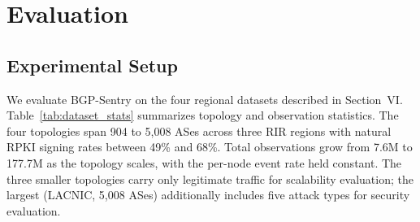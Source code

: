 \documentclass[conference]{IEEEtran}
\begin{document}
\section{Evaluation}

  \subsection{Experimental Setup}
  \label{sec:dataset}

We evaluate BGP-Sentry on the four regional datasets described in Section~VI. Table~\ref{tab:dataset_stats} summarizes topology and observation statistics. The four topologies span 904 to 5{,}008 ASes across three RIR regions with natural RPKI signing rates between 49\% and 68\%. Total observations grow from 7.6M to 177.7M as the topology scales, with the per-node event rate held constant. The three smaller topologies carry only legitimate traffic for scalability evaluation; the largest (LACNIC, 5{,}008 ASes) additionally includes five attack types for security evaluation.
\end{document}
